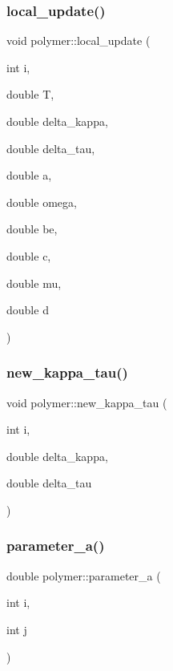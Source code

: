 \hypertarget{classpolymer_a7839c7cba47dbbfadedb6890d13970d1}{}\label{classpolymer_a7839c7cba47dbbfadedb6890d13970d1} 
\subsubsection{\texorpdfstring{local\+\_\+update()}{local\_update()}}
{\footnotesize\ttfamily void polymer\+::local\+\_\+update (\begin{DoxyParamCaption}\item[{int}]{i,  }\item[{double}]{T,  }\item[{double}]{delta\+\_\+kappa,  }\item[{double}]{delta\+\_\+tau,  }\item[{double}]{a,  }\item[{double}]{omega,  }\item[{double}]{be,  }\item[{double}]{c,  }\item[{double}]{mu,  }\item[{double}]{d }\end{DoxyParamCaption})}

\hypertarget{classpolymer_a63d6473a8c68d6da59673005f9b7db53}{}\label{classpolymer_a63d6473a8c68d6da59673005f9b7db53} 
\subsubsection{\texorpdfstring{new\+\_\+kappa\+\_\+tau()}{new\_kappa\_tau()}}
{\footnotesize\ttfamily void polymer\+::new\+\_\+kappa\+\_\+tau (\begin{DoxyParamCaption}\item[{int}]{i,  }\item[{double}]{delta\+\_\+kappa,  }\item[{double}]{delta\+\_\+tau }\end{DoxyParamCaption})}

\hypertarget{classpolymer_ab1dd0274207c36a79b7fb5674e7d0ed6}{}\label{classpolymer_ab1dd0274207c36a79b7fb5674e7d0ed6} 
\subsubsection{\texorpdfstring{parameter\+\_\+a()}{parameter\_a()}}
{\footnotesize\ttfamily double polymer\+::parameter\+\_\+a (\begin{DoxyParamCaption}\item[{int}]{i,  }\item[{int}]{j }\end{DoxyParamCaption})}


